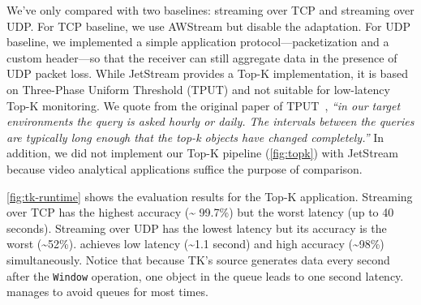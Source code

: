 \documentclass[twocolumn, 9pt]{article}
\begin{document}
We've only compared \sysname{} with two baselines: streaming over TCP and
streaming over UDP. For TCP baseline, we use AWStream but disable the
adaptation. For UDP baseline, we implemented a simple application
protocol---packetization and a custom header---so that the receiver can still
aggregate data in the presence of UDP packet loss. While JetStream provides a
Top-K implementation, it is based on Three-Phase Uniform Threshold (TPUT) and
not suitable for low-latency Top-K monitoring. We quote from the original paper
of TPUT~\cite{cao2004efficient}, \textit{``in our target environments the query
  is asked hourly or daily. The intervals between the queries are typically long
  enough that the top-k objects have changed completely.''} In addition, we did
not implement our Top-K pipeline (\autoref{fig:topk}) with JetStream because
video analytical applications suffice the purpose of comparison.

\autoref{fig:tk-runtime} shows the evaluation results for the Top-K
application. Streaming over TCP has the highest accuracy (\textasciitilde
99.7\%) but the worst latency (up to 40 seconds). Streaming over UDP has the
lowest latency but its accuracy is the worst (\textasciitilde 52\%). \sysname{}
achieves low latency (\textasciitilde 1.1 second) and high accuracy
(\textasciitilde 98\%) simultaneously. Notice that because TK's source generates
data every second after the \texttt{Window} operation, one object in the queue
leads to one second latency. \sysname{} manages to avoid queues for most times.

%
\end{document}
